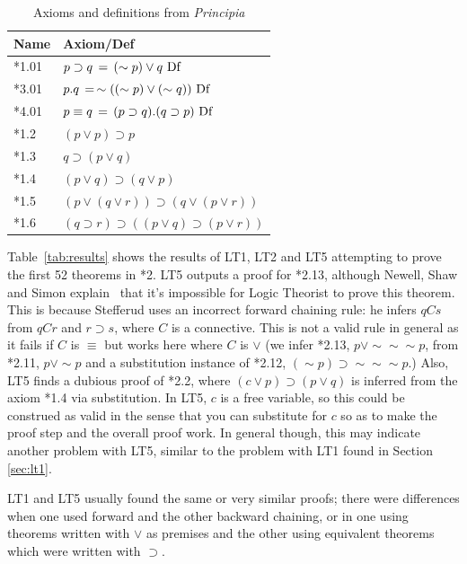 \documentclass[journal]{IEEEtran}
\begin{document}
%
%
\begin{table}[h]
\centering
\caption{Axioms and definitions from \textit{Principia}}
\label{tab:axioms}
\begin{tabular}{ll}
\toprule
\textbf{Name} & \textbf{Axiom/Def}\\
\midrule
*1.01  & $p\supset q \, = \,(\sim p) \vee q\ {\rm Df}$\\
*3.01  & 
$p.q \, = \, \sim((\sim p)\vee (\sim q))\ {\rm Df}$\\
*4.01  & $p\equiv q\, = \, (p\supset q).(q\supset p)\ {\rm Df}$\\
*1.2   & $(p\vee p)\supset p$\\
*1.3   & $q\supset(p\vee q)$\\
*1.4   & $(p\vee q)\supset(q \vee p)$\\
*1.5   & $(p\vee(q\vee r))\supset (q\vee(p \vee r))$\\
*1.6   & $(q\supset r)\supset((p\vee q)\supset(p\vee r))$\\
\bottomrule
\end{tabular}
\end{table}

Table~\ref{tab:results} shows the results of LT1, LT2 and LT5
attempting to prove the first 52 theorems in *2. 
LT5 outputs a proof for *2.13, although Newell, Shaw and Simon
explain~\cite[p.~222]{LT1957} that it's impossible for Logic 
Theorist to prove this theorem.  This is because Stefferud uses
an incorrect forward chaining rule: he infers $q C s$ from
$q C r$ and $r\supset s$, where $C$ is a connective.  This 
is not a valid rule in general as it fails if $C$ is $\equiv$
but works here where $C$ is $\vee$
(we infer *2.13, $p \vee \sim \sim \sim p$, from 
*2.11, $p \vee \sim p$
and a substitution instance of *2.12,
$(\sim p) \supset \sim \sim \sim p$.)
Also, LT5 finds a dubious proof of *2.2, where
$(c\vee p)\supset(p\vee q)$ is inferred from the axiom *1.4 via 
substitution.  In LT5, $c$ is a free variable,
so this could be construed as valid in the sense that you can
substitute for $c$ so as to make the proof step and the overall
proof work.  In general though, this may indicate another problem with LT5,
similar to the problem with LT1 found in Section \ref{sec:lt1}.

LT1 and LT5 usually found the same or very similar proofs;
there were differences when one used forward and the other
backward chaining, or in one using theorems written with $\vee$ as premises
and the other using equivalent theorems which were written with $\supset$.
\end{document}
